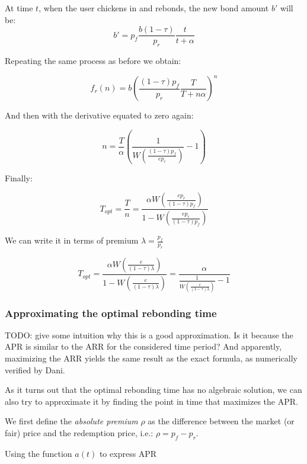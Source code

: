 \documentclass{article}
\begin{document}
At time $t$, when the user chickens in and rebonds, the new bond amount $b'$ will be:
\begin{equation}
b'= p_f\frac{b(1-\tau)}{p_r}\frac{t}{t+\alpha}
\end{equation}

Repeating the same process as before we obtain:

\begin{equation}
  \label{eq:n-rebond_3}
f_r(n) = b \left(\frac{(1-\tau)p_f}{p_r} \frac{T}{T+n \alpha} \right)^{n}
\end{equation}

And then with the derivative equated to zero again:

\[
n = \frac{T}{\alpha} \left(\frac{1}{W\left(\frac{(1-\tau)p_f}{e p_r} \right)} - 1\right)
\]

Finally:

\begin{equation}
  \label{}
T_{opt} = \frac{T}{n} = \frac{\alpha W\left(\frac{e p_r}{(1-\tau)p_f}\right)}{1 - W\left(\frac{e p_r}{(1-\tau)p_f}\right)}
\end{equation}

We can write it in terms of premium $\lambda = \frac{p_f}{p_r}$

\begin{equation}
  \label{eq:opt-rebonding-fee-premium}
T_{opt} = \frac{\alpha W\left(\frac{e}{(1-\tau)\lambda}\right)}{1 - W\left(\frac{e}{(1-\tau)\lambda}\right)} = \frac{\alpha}{\frac{1}{W\left(\frac{e}{(1-\tau)\lambda}\right)} - 1}
\end{equation}

\subsubsection{Approximating the optimal rebonding time}
TODO: give some intuition why this is a good approximation. Is it because the APR is similar to the ARR for the considered time period? And apparently, maximizing the ARR yields the same result as the exact formula, as numerically verified by Dani.

As it turns out that the optimal rebonding time has no algebraic solution, we can also try to approximate it by finding the point in time that maximizes the APR.

We first define the \textit{absolute premium} $\rho$ as the difference between the market (or fair) price and the redemption price, i.e.: $\rho = p_f - p_r$.

Using the function $a(t)$ to express APR
\end{document}
